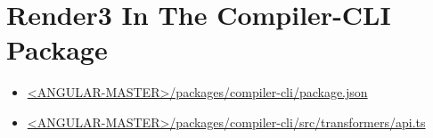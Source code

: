 \section{Render3 In The Compiler-CLI Package}


\begin{itemize}
  \item \href{https://github.com/angular/angular/blob/master/packages/compiler-cli/package.json}
        {<ANGULAR-MASTER>/packages/compiler-cli/package.json}
\end{itemize}

















\begin{itemize}
  \item \href{https://github.com/angular/angular/blob/master/packages/compiler-cli/src/transformers/api.ts}
        {<ANGULAR-MASTER>/packages/compiler-cli/src/transformers/api.ts}
\end{itemize}

